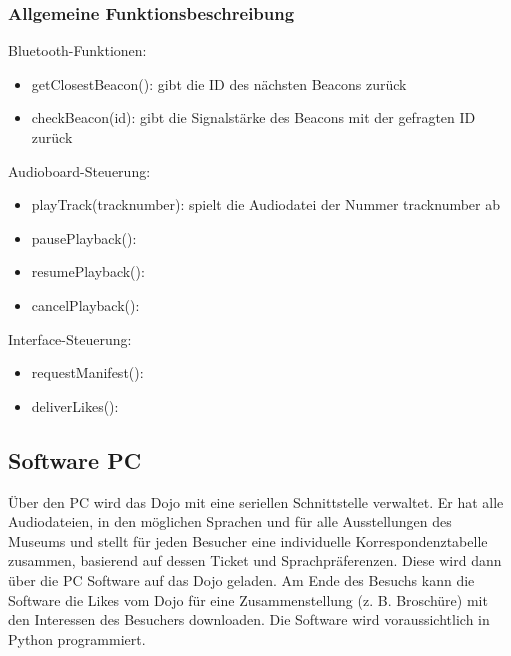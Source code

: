 \subsubsection{Allgemeine Funktionsbeschreibung}
Bluetooth-Funktionen:
\begin{itemize}
	\item getClosestBeacon(): gibt die ID des nächsten Beacons zurück
	\item checkBeacon(id): gibt die Signalstärke des Beacons mit der gefragten ID zurück
\end{itemize}
\vspace*{0.2cm}
Audioboard-Steuerung:
\begin{itemize}
	\item playTrack(tracknumber): spielt die Audiodatei der Nummer tracknumber ab
	\item pausePlayback():
	\item resumePlayback():
	\item cancelPlayback():
\end{itemize}
\vspace*{0.2cm}
Interface-Steuerung:
\begin{itemize}
	\item requestManifest():
	\item deliverLikes():
\end{itemize}

\subsection{Software PC}
Über den PC wird das Dojo mit eine seriellen Schnittstelle verwaltet. Er hat alle Audiodateien, in den möglichen Sprachen und für alle Ausstellungen des Museums und stellt für jeden Besucher eine individuelle Korrespondenztabelle zusammen, basierend auf dessen Ticket und Sprachpräferenzen. Diese wird dann über die PC Software auf das Dojo geladen. Am Ende des Besuchs kann die Software die Likes vom Dojo für eine Zusammenstellung (z. B. Broschüre) mit den Interessen des Besuchers downloaden. Die Software wird voraussichtlich in Python programmiert.\\

